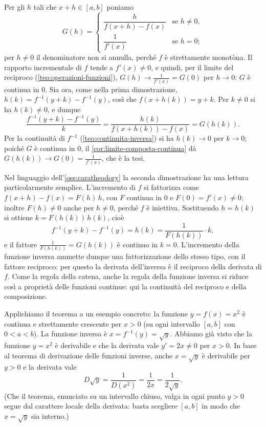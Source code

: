 \begin{dimostrazione}
Per gli $h$ tali che $x+h\in[a,b]$ poniamo
\begin{equation}\label{eq:funzione-G-inversa}
  G(h)=
  \begin{cases}
    \dfrac{h}{f(x+h)-f(x)} & \text{se } h\neq0,\\[1.5ex]
    \dfrac1{f'(x)} & \text{se } h=0;
  \end{cases}
\end{equation}
per $h\neq0$ il denominatore non si annulla, perché $f$ è strettamente monotòna. Il
rapporto incrementale di $f$ tende a $f'(x)\neq0$, e quindi, per il limite del reciproco
(\cref{teo:operazioni-funzioni}), $G(h)\to\frac1{f'(x)}=G(0)$ per $h\to0$: $G$ è continua
in $0$. Sia ora, come nella prima dimostrazione, $h(k)=f^{-1}(y+k)-f^{-1}(y)$, così che
$f(x+h(k))=y+k$. Per $k\neq0$ si ha $h(k)\neq0$, e dunque
\[
  \frac{f^{-1}(y+k)-f^{-1}(y)}{k}=\frac{h(k)}{f(x+h(k))-f(x)}=G(h(k)).
\]
Per la continuità di $f^{-1}$ (\cref{teo:continuita-inversa}) si ha $h(k)\to0$ per
$k\to0$; poiché $G$ è continua in $0$, il \cref{cor:limite-composta-continua} dà
$G(h(k))\to G(0)=\frac1{f'(x)}$, che è la tesi.
\end{dimostrazione}

\begin{osservazione}
Nel linguaggio dell'\cref{oss:caratheodory} la seconda dimostrazione ha una lettura
particolarmente semplice. L'incremento di $f$ si fattorizza come $f(x+h)-f(x)=F(h)\,h$,
con $F$ continua in $0$ e $F(0)=f'(x)\neq0$; inoltre $F(h)\neq0$ anche per $h\neq0$, perché
$f$ è iniettiva. Sostituendo $h=h(k)$ si ottiene $k=F(h(k))\,h(k)$, cioè
\[
  f^{-1}(y+k)-f^{-1}(y)=h(k)=\frac1{F(h(k))}\cdot k,
\]
e il fattore $\frac1{F(h(k))}=G(h(k))$ è continuo in $k=0$. L'incremento della funzione
inversa ammette dunque una fattorizzazione dello stesso tipo, con il fattore reciproco:
per questo la derivata dell'inversa è il reciproco della derivata di $f$. Come la regola
della catena, anche la regola della funzione inversa si riduce così a proprietà delle
funzioni continue: qui la continuità del reciproco e della composizione.
\end{osservazione}

Applichiamo il teorema a un esempio concreto: la funzione $y=f(x)=x^{2}$ è continua e
strettamente crescente per $x>0$ (su ogni intervallo $[a,b]$ con $0<a<b$). La funzione
inversa è $x=f^{-1}(y)=\sqrt y$. Abbiamo già visto che la funzione $y=x^{2}$ è derivabile
e che la derivata vale $y'=2x\neq0$ per $x>0$. In base al teorema di derivazione delle
funzioni inverse, anche $x=\sqrt y$ è derivabile per $y>0$ e la derivata vale
\begin{equation}\label{eq:derivata-radice}
  D\sqrt y=\frac1{D(x^{2})}=\frac1{2x}=\frac1{2\sqrt y}.
\end{equation}
(Che il teorema, enunciato su un intervallo chiuso, valga in ogni punto $y>0$ segue dal
carattere locale della derivata: basta scegliere $[a,b]$ in modo che $x=\sqrt y$ sia
interno.)

